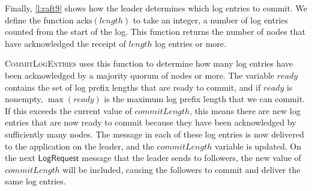 Finally, \autoref{l:raft9} shows how the leader determines which log entries to commit.
We define the function $\mathrm{acks}(\mathit{length})$ to take an integer, a number of log entries counted from the start of the log.
This function returns the number of nodes that have acknowledged the receipt of $\mathit{length}$ log entries or more.

\textsc{CommitLogEntries} uses this function to determine how many log entries have been acknowledged by a majority quorum of nodes or more.
The variable $\mathit{ready}$ contains the set of log prefix lengths that are ready to commit, and if $\mathit{ready}$ is nonempty, $\max(\mathit{ready})$ is the maximum log prefix length that we can commit.
If this exceeds the current value of $\mathit{commitLength}$, this means there are new log entries that are now ready to commit because they have been acknowledged by sufficiently many nodes.
The message in each of these log entries is now delivered to the application on the leader, and the $\mathit{commitLength}$ variable is updated.
On the next $\mathsf{LogRequest}$ message that the leader sends to followers, the new value of $\mathit{commitLength}$ will be included, causing the followers to commit and deliver the same log entries.

